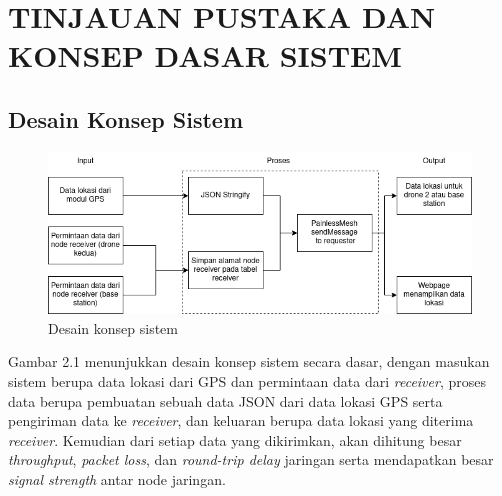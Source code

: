 \chapter{TINJAUAN PUSTAKA DAN KONSEP DASAR SISTEM}

\section{Desain Konsep Sistem}
\begin{figure}[h]
	\includegraphics[scale=0.60]{./assets/IOProses}
	\caption{Desain konsep sistem}
\end{figure}
Gambar 2.1 menunjukkan desain konsep sistem secara dasar, dengan masukan sistem berupa data lokasi dari GPS dan permintaan data dari \textit{receiver}, proses data berupa pembuatan sebuah data JSON dari data lokasi GPS serta pengiriman data ke \textit{receiver}, dan keluaran berupa data lokasi yang diterima \textit{receiver}. Kemudian dari setiap data yang dikirimkan, akan dihitung besar \textit{throughput}, \textit{packet loss}, dan \textit{round-trip delay} jaringan serta mendapatkan besar \textit{signal strength} antar node jaringan.

